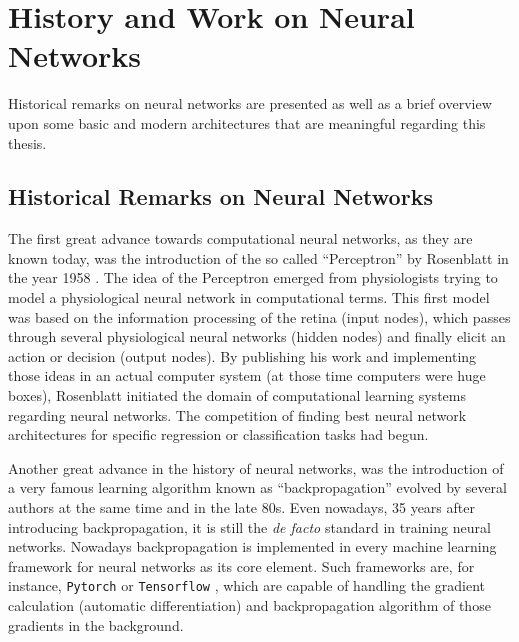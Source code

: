 
\section{History and Work on Neural Networks}\label{sec:prev_nn}
Historical remarks on neural networks are presented as well as a brief overview upon some basic and modern architectures that are meaningful regarding this thesis.



\subsection{Historical Remarks on Neural Networks}\label{sec:prev_nn_history}
The first great advance towards computational neural networks, as they are known today, was the introduction of the so called \enquote{Perceptron} by Rosenblatt in the year 1958 \cite{Rosenblatt1958}. 
The idea of the Perceptron emerged from physiologists trying to model a physiological neural network in computational terms. 
This first model was based on the information processing of the retina (input nodes), which passes through several physiological neural networks (hidden nodes) and finally elicit an action or decision (output nodes).
By publishing his work and implementing those ideas in an actual computer system (at those time computers were huge boxes), Rosenblatt initiated the domain of computational learning systems regarding neural networks.
The competition of finding best neural network architectures for specific regression or classification tasks had begun.

Another great advance in the history of neural networks, was the introduction of a very famous learning algorithm known as \enquote{backpropagation} evolved by several authors at the same time \cite{LeCun1986} and \cite{Rumelhart1986} in the late 80s. 
Even nowadays, 35 years after introducing backpropagation, it is still the \emph{de facto} standard in training neural networks.
Nowadays backpropagation is implemented in every machine learning framework for neural networks as its core element.
Such frameworks are, for instance, \texttt{Pytorch} \cite{Pytorch} or \texttt{Tensorflow} \cite{Tensorflow}, which are capable of handling the gradient calculation (automatic differentiation) and backpropagation algorithm of those gradients in the background.


